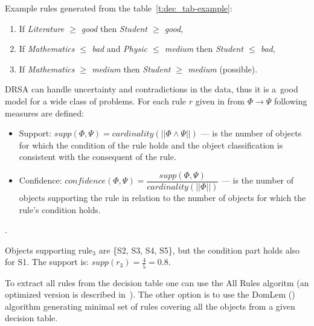 Example rules generated from the table~\ref{t:dec_tab-example}:
\begin{enumerate}
\item If \textit{Literature $\ge$ good} then \textit{Student $\ge$ good},
\item If \textit{Mathematics $\le$ bad} and \textit{Physic $\le$ medium} then
  \textit{Student $\le$ bad},
\item If \textit{Mathematics $\ge$ medium} then \textit{Student $\ge$ medium}
  (possible).
\end{enumerate}

DRSA can handle uncertainty and contradictions in the data, thus it is a~good
model for a wide class of problems. For each rule $r$ given in from $\Phi \to
\Psi$ following measures are defined:
\begin{itemize}
\item Support: $\textit{supp}(\Phi, \Psi) = \textit{cardinality}(||\Phi \land
  \Psi||)$ --- is the number of objects for which the condition of the rule
  holds and the object classification is consistent with the consequent of the
  rule.
\item Confidence: $\textit{confidence}(\Phi, \Psi) =
  \dfrac{\textit{supp}(\Phi, \Psi)}{\textit{cardinality}(||\Phi||)}$ --- is
  the number of objects supporting the rule in relation to the number of
  objects for which the rule's condition holds.
\end{itemize}.

Objects supporting rule$_3$ are \{S2, S3, S4, S5\}, but the condition part
holds also for S1. The support is: $\textit{supp}(r_3) = \frac{4}{5} = 0.8$.

To extract all rules from the decision table one can use the All Rules
algoritm (an optimized version is described in~\cite{Zur01}). The other option
is to use the DomLem (\cite{GMS+01}) algorithm generating minimal set of rules
covering all the objects from a given decision table.


